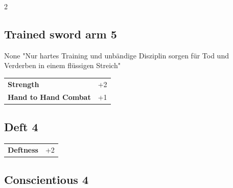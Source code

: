\begin{multicols}{2}
\begin{tcolorbox}

\end{tcolorbox}

\begin{tcolorbox}
    \subsection*{Trained sword arm \hfill \small{5 }}
    \tcblower


\begin{pquote}{None}
"Nur hartes Training und unbändige Disziplin sorgen für Tod und Verderben in einem flüssigen Streich"
\end{pquote}

\vspace{3mm}

\begin{tabular}{@{}ll@{}}
    \textbf{Strength} & +2\\
    \textbf{Hand to Hand Combat} & +1\\
\end{tabular}


\end{tcolorbox}

\begin{tcolorbox}
    \subsection*{Deft \hfill \small{4 }}
    \tcblower




\begin{tabular}{@{}ll@{}}
    \textbf{Deftness} & +2\\
\end{tabular}


\end{tcolorbox}

\begin{tcolorbox}
    \subsection*{Conscientious \hfill \small{4 }}
    \tcblower





\end{tcolorbox}
\end{multicols}
